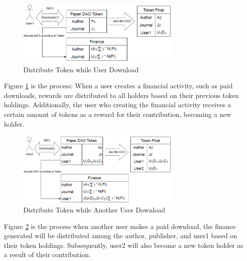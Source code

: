 \documentclass[lettersize,journal]{IEEEtran}
\begin{document}
\begin{figure}[h]
  \centering
  \includegraphics[width=3.2in]{assets/download1.png}
  \caption{Distribute Token while User Download}
  \label{fig:financetoken}
\end{figure}

Figure \ref{fig:financetoken} is the process: When a user creates a financial activity, such as paid downloads, rewards are distributed to all holders based on their previous token holdings. Additionally, the user who creating the financial activity receives a certain amount of tokens as a reward for their contribution, becoming a new holder.


\begin{figure}[h]
  \centering
  \includegraphics[width=3.2in]{assets/donwload2.png}
  \caption{Distribute Token while Another User Download}
  \label{fig:financetoken2}
\end{figure}

Figure \ref{fig:financetoken2} is the process when another user makes a paid download, the finance generated will be distributed among the author, publisher, and user1 based on their token holdings. Subsequently, user2 will also become a new token holder as a result of their contribution.
\end{document}
